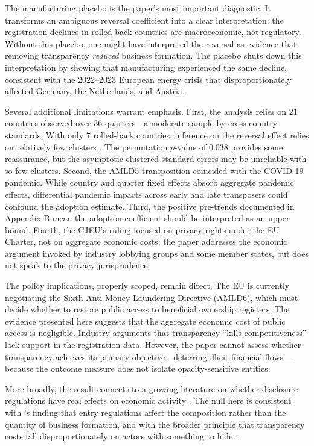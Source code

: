 \documentclass[12pt]{article}
\begin{document}
The manufacturing placebo is the paper's most important diagnostic. It transforms an ambiguous reversal coefficient into a clear interpretation: the registration declines in rolled-back countries are macroeconomic, not regulatory. Without this placebo, one might have interpreted the reversal as evidence that removing transparency \textit{reduced} business formation. The placebo shuts down this interpretation by showing that manufacturing experienced the same decline, consistent with the 2022--2023 European energy crisis that disproportionately affected Germany, the Netherlands, and Austria.

Several additional limitations warrant emphasis. First, the analysis relies on 21 countries observed over 36 quarters---a moderate sample by cross-country standards. With only 7 rolled-back countries, inference on the reversal effect relies on relatively few clusters \citep{cameron2008bootstrap, conley2011inference}. The permutation $p$-value of 0.038 provides some reassurance, but the asymptotic clustered standard errors may be unreliable with so few clusters. Second, the AMLD5 transposition coincided with the COVID-19 pandemic. While country and quarter fixed effects absorb aggregate pandemic effects, differential pandemic impacts across early and late transposers could confound the adoption estimate. Third, the positive pre-trends documented in Appendix B mean the adoption coefficient should be interpreted as an upper bound. Fourth, the CJEU's ruling focused on privacy rights under the EU Charter, not on aggregate economic costs; the paper addresses the economic argument invoked by industry lobbying groups and some member states, but does not speak to the privacy jurisprudence.

The policy implications, properly scoped, remain direct. The EU is currently negotiating the Sixth Anti-Money Laundering Directive (AMLD6), which must decide whether to restore public access to beneficial ownership registers. The evidence presented here suggests that the aggregate economic cost of public access is negligible. Industry arguments that transparency ``kills competitiveness'' lack support in the registration data. However, the paper cannot assess whether transparency achieves its primary objective---deterring illicit financial flows---because the outcome measure does not isolate opacity-sensitive entities.

More broadly, the result connects to a growing literature on whether disclosure regulations have real effects on economic activity \citep{leuz2003earnings, christensen2017capital, bennedsen2022corporate}. The null here is consistent with \citet{djankov2002regulation}'s finding that entry regulations affect the composition rather than the quantity of business formation, and with the broader principle that transparency costs fall disproportionately on actors with something to hide \citep{slemrod2019tax, naritomi2019consumers}.
\end{document}
